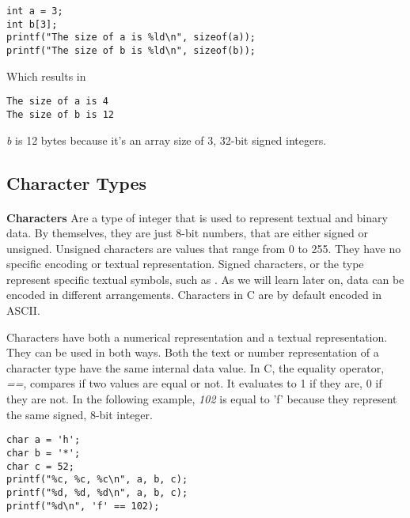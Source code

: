 \begin{lstlisting}[style=customc]
int a = 3;
int b[3];
printf("The size of a is %ld\n", sizeof(a));
printf("The size of b is %ld\n", sizeof(b));
\end{lstlisting}

Which results in

\begin{lstlisting}[style=customc]
The size of a is 4
The size of b is 12
\end{lstlisting}

\emph{b} is 12 bytes because it's an array size of 3, 32-bit signed integers.

\subsection{Character Types}

\paragraph{  } \textbf{Characters} Are a type of integer that is used to represent textual and binary data. By themselves, they are just 8-bit numbers, that are either signed or unsigned. Unsigned characters are values that range from 0 to 255. They have no specific encoding or textual representation. Signed characters, or the  type represent specific textual symbols, such as . As we will learn later on, data can be encoded in different arrangements. Characters in C are by default encoded in ASCII. 

\par Characters have both a numerical representation and a textual representation. They can be used in both ways. Both the text or number representation of a character type have the same internal data value. In C, the equality operator, \emph{==}, compares if two values are equal or not. It evaluates to 1 if they are, 0 if they are not. In the following example, \emph{102} is equal to {'f'} because they represent the same signed, 8-bit integer.

\begin{lstlisting}[style=numc]
char a = 'h';
char b = '*';
char c = 52;
printf("%c, %c, %c\n", a, b, c);
printf("%d, %d, %d\n", a, b, c);
printf("%d\n", 'f' == 102);
\end{lstlisting}
